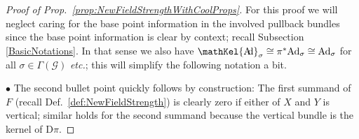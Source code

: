 \documentclass[a4paper,oneside,11pt,bibliography=totoc]{scrartcl}
\DeclareMathOperator{\sAd}{\mathKel{A\mkern-5.5mu d}}
\theoremstyle{plain}
\theoremstyle{remark}
\theoremstyle{definition}
\begin{document}
\begin{proof}[Proof of Prop.\ \ref{prop:NewFieldStrengthWithCoolProps}]
\leavevmode\newline
For this proof we will neglect caring for the base point information in the involved pullback bundles since the base point information is clear by context; recall Subsection \ref{BasicNotations}. In that sense we also have $\sAd_\sigma \cong \pi^*\mathrm{Ad}_\sigma \cong \mathrm{Ad}_\sigma$ for all $\sigma \in \Gamma(\mathcal{G})$ \textit{etc.}; this will simplify the following notation a bit.

$\bullet$ The second bullet point quickly follows by construction: The first summand of $F$ (recall Def.\ \ref{def:NewFieldStrength}) is clearly zero if either of $X$ and $Y$ is vertical; similar holds for the second summand because the vertical bundle is the kernel of $\mathrm{D}\pi$.


\end{proof}
\end{document}
